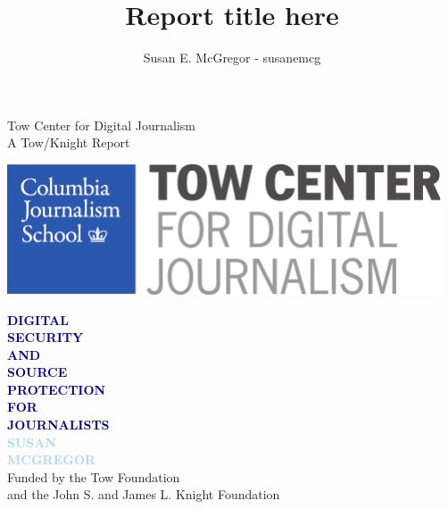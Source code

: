 \documentclass[symmetric, notoc]{tufte-book}
\title{Report title here}
\author{Susan E. McGregor - susanemcg}
\newcommand{\blankpage}{\newpage\hbox{}\thispagestyle{empty}\newpage}
\begin{document}
\frontmatter

\blankpage



\begin{minipage}[t][1\textheight]{0.40\textwidth}
\vspace{0pt}
\begin{flushleft}
\small\textsf{Tow Center for Digital Journalism\\
A Tow/Knight Report}
\end{flushleft}
\vfill
\includegraphics[width=.4\textwidth]{graphics/ColumbiaLogo.pdf}
\end{minipage}%
\hfill
\begin{minipage}[t][1\textheight]{70mm}
\vspace{0pt}
\Huge\textcolor{darkblue}{\textbf{{\titlefont DIGITAL\\ SECURITY\\
AND\\
SOURCE\\ PROTECTION\\
FOR\\
JOURNALISTS\\
\textcolor{lightblue}{
SUSAN\\
MCGREGOR\\
}
}
}}
\vfill
\small\textsf{Funded by the Tow Foundation\\
and the John S. and James L. Knight Foundation}
\end{minipage}%
\end{document}
